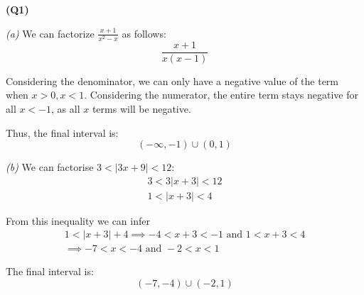 \documentclass[12pt, a4paper]{article}
\begin{document}
\textbf{(Q1)}

\textit{(a)}
We can factorize $\displaystyle{\frac{x + 1}{x^2 - x}}$ as follows:
\[
    \frac{x + 1}{x(x - 1)}
\]

Considering the denominator, we can only have a negative value of the term
when $x > 0, x < 1$. Considering the numerator, the entire term stays negative
for all $x < -1$, as all $x$ terms will be negative.

Thus, the final interval is:
\[
    (-\infty, -1) \cup (0, 1)
\]

\textit{(b)}
We can factorise $3 < |3x + 9| < 12$:
\begin{gather*}
    3 < 3|x + 3| < 12\\
    1 < |x + 3| < 4
\end{gather*}

From this inequality we can infer
\begin{gather*}
    1 < |x + 3| + 4 \implies -4 < x + 3 < -1 \text{ and } 1 < x + 3 < 4\\
    \implies -7 < x < -4 \text{ and } -2 < x < 1
\end{gather*}

The final interval is:
\[
    (-7, -4) \cup (-2, 1)
\]
\end{document}
